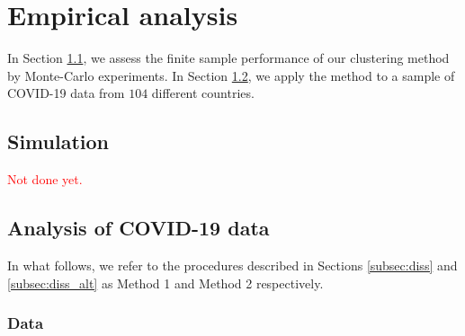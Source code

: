 \documentclass[a4paper,12pt]{article}
\numberwithin{equation}{section}
\begin{document}



\section{Empirical analysis}\label{sec:app}


In Section \ref{subsec:sim}, we assess the finite sample performance of our clustering method by Monte-Carlo experiments. In Section \ref{subsec:app}, we apply the method to a sample of COVID-19 data from $104$ different countries. 



\subsection{Simulation}\label{subsec:sim}


\textcolor{red}{Not done yet.} 


\subsection{Analysis of COVID-19 data}\label{subsec:app}

In what follows, we refer to the procedures described in Sections \ref{subsec:diss} and \ref{subsec:diss_alt} as Method 1 and Method 2 respectively.

\subsubsection{Data}
\end{document}

